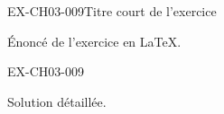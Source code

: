 
\begin{exercice}{EX-CH03-009}{Titre court de l'exercice}

Énoncé de l'exercice en \LaTeX.

\end{exercice}

\begin{solution}{EX-CH03-009}

Solution détaillée.

\end{solution}